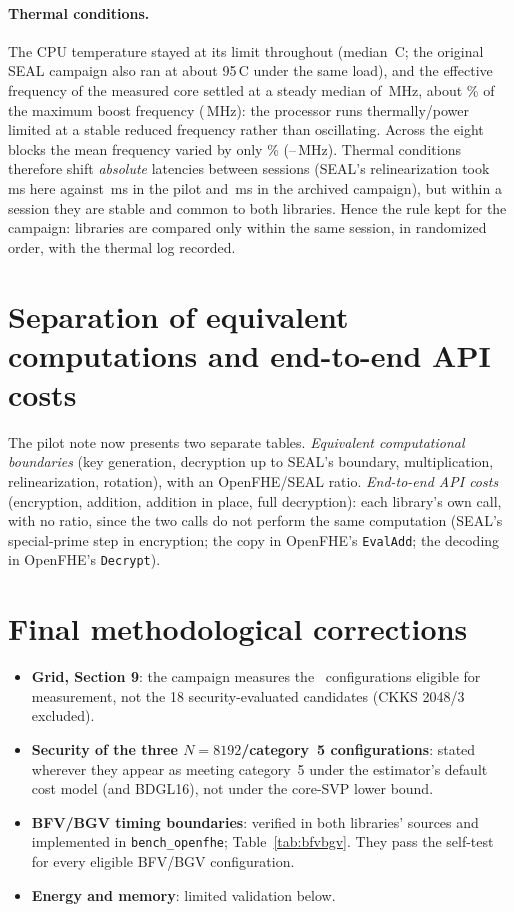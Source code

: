 \documentclass[11pt]{article}
\begin{document}
\paragraph{Thermal conditions.} The CPU temperature stayed at its limit throughout (median \tempMedianA\,\textdegree C; the original SEAL campaign also ran at about 95\,\textdegree C under the same load), and the effective frequency of the measured core settled at a steady median of \freqMedianA\,MHz, about \freqShareOfMax\% of the maximum boost frequency (\freqMaxBoost\,MHz): the processor runs thermally/power limited at a stable reduced frequency rather than oscillating. Across the eight blocks the mean frequency varied by only \blockFreqSpread\% (\blockFreqMin--\blockFreqMax\,MHz). Thermal conditions therefore shift \emph{absolute} latencies between sessions (SEAL's relinearization took \relinHere\,ms here against \relinPilot\,ms in the pilot and \relinArchived\,ms in the archived campaign), but within a session they are stable and common to both libraries. Hence the rule kept for the campaign: libraries are compared only within the same session, in randomized order, with the thermal log recorded.

\section{Separation of equivalent computations and end-to-end API costs}

The pilot note now presents two separate tables. \emph{Equivalent computational boundaries} (key generation, decryption up to SEAL's boundary, multiplication, relinearization, rotation), with an OpenFHE/SEAL ratio. \emph{End-to-end API costs} (encryption, addition, addition in place, full decryption): each library's own call, with no ratio, since the two calls do not perform the same computation (SEAL's special-prime step in encryption; the copy in OpenFHE's \texttt{EvalAdd}; the decoding in OpenFHE's \texttt{Decrypt}).

\section{Final methodological corrections}

\begin{itemize}[leftmargin=*, itemsep=2pt]
  \item \textbf{Grid, Section 9}: the campaign measures the \eligible\ configurations eligible for measurement, not the 18 security-evaluated candidates (CKKS 2048/3 excluded).
  \item \textbf{Security of the three $N{=}8192$/category~5 configurations}: stated wherever they appear as meeting category~5 under the estimator's default cost model (and BDGL16), not under the core-SVP lower bound.
  \item \textbf{BFV/BGV timing boundaries}: verified in both libraries' sources and implemented in \texttt{bench\_openfhe}; Table~\ref{tab:bfvbgv}. They pass the self-test for every eligible BFV/BGV configuration.
  \item \textbf{Energy and memory}: limited validation below.
\end{itemize}
\end{document}
